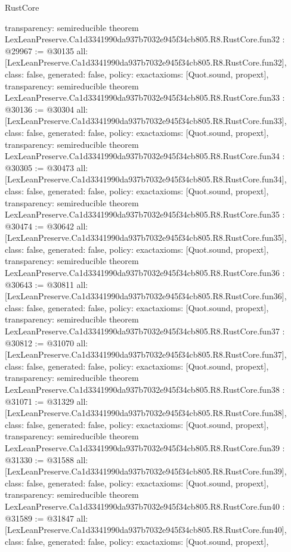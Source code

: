 \begin{lexlean}{RustCore}
\begin{coremodule}
{  transparency: semireducible
}
theorem LexLeanPreserve.Ca1d3341990da937b7032e945f34cb805.R8.RustCore.fun32 : @29967 := @30135 {
  all: [LexLeanPreserve.Ca1d3341990da937b7032e945f34cb805.R8.RustCore.fun32],
  class: false,
  generated: false,
  policy: exact{axioms: [Quot.sound, propext]},
  transparency: semireducible
}
theorem LexLeanPreserve.Ca1d3341990da937b7032e945f34cb805.R8.RustCore.fun33 : @30136 := @30304 {
  all: [LexLeanPreserve.Ca1d3341990da937b7032e945f34cb805.R8.RustCore.fun33],
  class: false,
  generated: false,
  policy: exact{axioms: [Quot.sound, propext]},
  transparency: semireducible
}
theorem LexLeanPreserve.Ca1d3341990da937b7032e945f34cb805.R8.RustCore.fun34 : @30305 := @30473 {
  all: [LexLeanPreserve.Ca1d3341990da937b7032e945f34cb805.R8.RustCore.fun34],
  class: false,
  generated: false,
  policy: exact{axioms: [Quot.sound, propext]},
  transparency: semireducible
}
theorem LexLeanPreserve.Ca1d3341990da937b7032e945f34cb805.R8.RustCore.fun35 : @30474 := @30642 {
  all: [LexLeanPreserve.Ca1d3341990da937b7032e945f34cb805.R8.RustCore.fun35],
  class: false,
  generated: false,
  policy: exact{axioms: [Quot.sound, propext]},
  transparency: semireducible
}
theorem LexLeanPreserve.Ca1d3341990da937b7032e945f34cb805.R8.RustCore.fun36 : @30643 := @30811 {
  all: [LexLeanPreserve.Ca1d3341990da937b7032e945f34cb805.R8.RustCore.fun36],
  class: false,
  generated: false,
  policy: exact{axioms: [Quot.sound, propext]},
  transparency: semireducible
}
theorem LexLeanPreserve.Ca1d3341990da937b7032e945f34cb805.R8.RustCore.fun37 : @30812 := @31070 {
  all: [LexLeanPreserve.Ca1d3341990da937b7032e945f34cb805.R8.RustCore.fun37],
  class: false,
  generated: false,
  policy: exact{axioms: [Quot.sound, propext]},
  transparency: semireducible
}
theorem LexLeanPreserve.Ca1d3341990da937b7032e945f34cb805.R8.RustCore.fun38 : @31071 := @31329 {
  all: [LexLeanPreserve.Ca1d3341990da937b7032e945f34cb805.R8.RustCore.fun38],
  class: false,
  generated: false,
  policy: exact{axioms: [Quot.sound, propext]},
  transparency: semireducible
}
theorem LexLeanPreserve.Ca1d3341990da937b7032e945f34cb805.R8.RustCore.fun39 : @31330 := @31588 {
  all: [LexLeanPreserve.Ca1d3341990da937b7032e945f34cb805.R8.RustCore.fun39],
  class: false,
  generated: false,
  policy: exact{axioms: [Quot.sound, propext]},
  transparency: semireducible
}
theorem LexLeanPreserve.Ca1d3341990da937b7032e945f34cb805.R8.RustCore.fun40 : @31589 := @31847 {
  all: [LexLeanPreserve.Ca1d3341990da937b7032e945f34cb805.R8.RustCore.fun40],
  class: false,
  generated: false,
  policy: exact{axioms: [Quot.sound, propext]},
}
\end{coremodule}
\end{lexlean}
